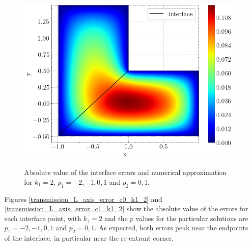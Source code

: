 \begin{figure}[!htb]
    \begin{minipage}{.6\textwidth}
      \centering
      \includegraphics[width=\linewidth]{Images/Transmission/L_shape_2_axis_sol_k1_2_enr.png}
      \label{transmission_L_axis_plot_k1_2}
    \end{minipage}

    \caption{Absolute value of the interface errors and numerical approximation for \(k_1=2\), \(p_1=-2, -1, 0, 1\) and \(p_2 = 0, 1\).}
    \label{}
\end{figure}

Figures \ref{transmission_L_axis_error_c0_k1_2} and \ref{transmission_L_axis_error_c1_k1_2} show the absolute value of the errors for each interface point, with \(k_1=2\) and the \(p\) values for the particular solutions are \(p_1=-2, -1, 0, 1\) and \(p_2 = 0, 1\). As expected, both errors peak near the endpoints of the interface, in particular near the re-entrant corner.
